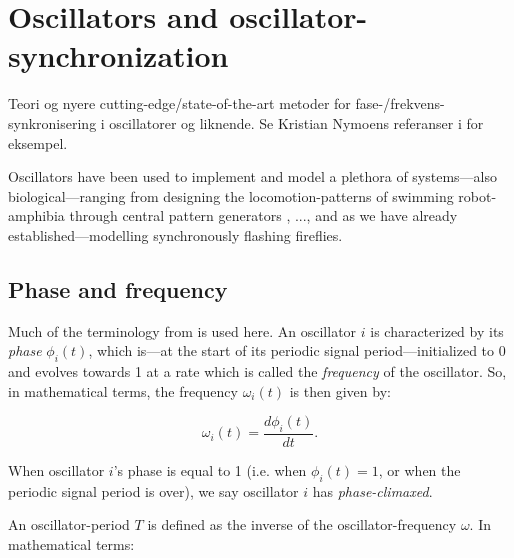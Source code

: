 
\section{Oscillators and oscillator-synchronization}

	
	
	Teori og nyere cutting-edge/state-of-the-art metoder for fase-/frekvens-synkronisering i oscillatorer og liknende. Se Kristian Nymoens referanser i \cite{nymoen_synch} for eksempel. \nl
	
	Oscillators have been used to implement and model a plethora of systems—also biological—ranging from designing the locomotion-patterns of swimming robot-amphibia through central pattern generators \cite{ijspeert_cpg}, ..., and as we have already established—modelling synchronously flashing fireflies.
	
	\subsection{Phase and frequency}
	
	Much of the terminology from \cite{nymoen_synch} is used here. An oscillator $i$ is characterized by its \textit{phase} $\phi_i(t)$, which is—at the start of its periodic signal period—initialized to 0 and evolves towards 1 at a rate which is called the \textit{frequency} of the oscillator. So, in mathematical terms, the frequency $\omega_i(t)$ is then given by:
	
	\begin{equation}
	\label{phase_freq}
		\omega_i(t) = \frac{d \phi_i(t)}{d t} .
	\end{equation}

	When oscillator $i$'s phase is equal to 1 (i.e. when $\phi_i(t)=1$, or when the periodic signal period is over), we say oscillator $i$ has \textit{phase-climaxed}.
	
	An oscillator-period $T$ is defined as the inverse of the oscillator-frequency $\omega$. In mathematical terms:
	
